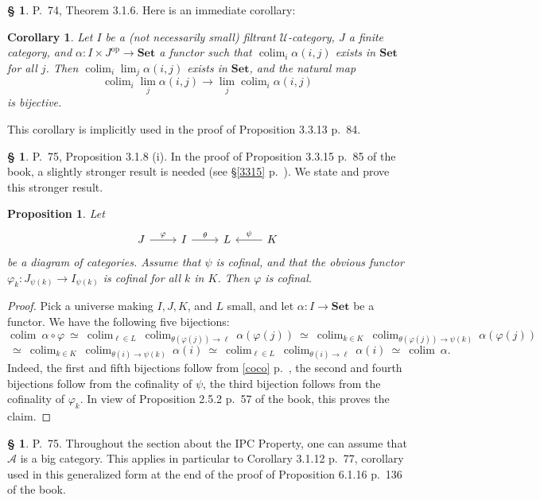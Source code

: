 \documentclass[12pt]{article}%
\newtheorem{prop}[thm]{Proposition}
\newtheorem{cor}[thm]{Corollary}
\theoremstyle{remark}
\theoremstyle{definition}
\newtheorem{s}[thm]{\S}%
\newcommand{\A}{\mathcal A}
\newcommand{\U}{\mathcal U}
\newcommand{\Set}{\mathbf{Set}}%
\newcommand{\pp}{\varphi}
\DeclareMathOperator*{\colim}{colim}%
\DeclareMathOperator{\op}{op}
\begin{document}
%

\begin{s} 
P.~74, Theorem 3.1.6. Here is an immediate corollary: 
%
\begin{cor}\label{316}
Let $I$ be a (not necessarily small) filtrant $\U$-category, $J$ a finite category, and $\alpha:I\times J^{\op}\to\Set$ a functor such that $\colim_i\alpha(i,j)$ exists in $\Set$ for all $j$. Then $\colim_i\lim_j\alpha(i,j)$ exists in $\Set$, and the natural map 
$$
\colim_i\lim_j\alpha(i,j)\to
\lim_j\colim_i\alpha(i,j)
$$ 
is bijective. 
\end{cor}
%
This corollary is implicitly used in the proof of Proposition 3.3.13 p.~84.
\end{s}

%

\begin{s} 
P.~75, Proposition 3.1.8 (i). In the proof of Proposition 3.3.15 p.~85 of the book, a slightly stronger result is needed (see \S\ref{3315} p.~\pageref{3315}). We state and prove this stronger result. 
%
\begin{prop}\label{318i} 
%
Let 
$$
\begin{tikzcd}
J\ar{r}{\pp}&I\ar{r}{\theta}&L&K\ar{l}[swap]{\psi}
\end{tikzcd}
$$
be a diagram of categories. Assume that $\psi$ is cofinal, and that the obvious functor $\pp_k:J_{\psi(k)}\to I_{\psi(k)}$ is cofinal for all $k$ in $K$. Then $\pp$ is cofinal. 
%
\end{prop} 
%
\begin{proof}
Pick a universe making $I,J,K$, and $L$ small, and let $\alpha:I\to\Set$ be a functor. We have the following five bijections:
$$
\colim\ \alpha\circ\pp\ \simeq\ 
%
\colim_{\ell\in L}\ \colim_{\theta(\pp(j))\to\ell}\ \alpha(\pp(j))\ \simeq\ 
%
\colim_{k\in K}\ \colim_{\theta(\pp(j))\to\psi(k)}\ \alpha(\pp(j))
$$
$$
\ \simeq\ \colim_{k\in K}\ \colim_{\theta(i)\to\psi(k)}\ \alpha(i)\ \simeq\ 
%
\colim_{\ell\in L}\ \colim_{\theta(i)\to\ell}\ \alpha(i)\ \simeq\ 
%
\colim\ \alpha.
$$
Indeed, the first and fifth bijections follow from \eqref{coco} p.~\pageref{coco}, the second and fourth bijections follow from the cofinality of $\psi$, the third bijection follows from the cofinality of $\pp_k$. In view of Proposition 2.5.2 p.~57 of the book, this proves the claim.
\end{proof}
\end{s}

%

\begin{s}\label{cipc}
P.~75. Throughout the section about the IPC Property, one can assume that $\A$ is a big category. This applies in particular to Corollary 3.1.12 p.~77, corollary used in this generalized form at the end of the proof of Proposition 6.1.16 p.~136 of the book.
\end{s}
\end{document}
